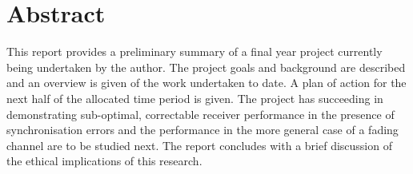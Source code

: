 

\begingroup
\let\clearpage\relax
\let\cleardoublepage\relax
\let\cleardoublepage\relax

\chapter*{Abstract} %

This report provides a preliminary summary of a final year project currently being undertaken by the author. The project goals and background are described and an overview is given of the work undertaken to date. A plan of action for the next half of the allocated time period is given. The project has succeeding in demonstrating sub-optimal, correctable receiver performance in the presence of synchronisation errors and the performance in the more general case of a fading channel are to be studied next. The report concludes with a brief discussion of the ethical implications of this research.

\endgroup			

\vfill